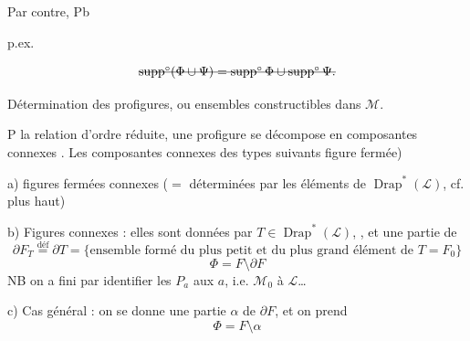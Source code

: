 \documentclass[11pt,a4paper]{article}
\begin{document}

Par contre,  Pb 


p.ex.



     
\[ \text{\struck{$\operatorname{supp}^\circ(\Phi\cup\Psi)=\operatorname{supp}^\circ\Phi\cup\operatorname{supp}^\circ\Psi$.}} \]

Détermination des profigures, ou ensembles constructibles dans $\mathcal{M}$.

 P\ill{} la relation d'ordre réduite, une profigure se décompose en composantes connexes . Les composantes connexes  des types suivants
   figure fermée)
 

a) figures fermées connexes  ($=$ déterminées par les éléments de $\operatorname{Drap}^*(\mathcal{L})$, cf. plus haut)

b) Figures  connexes :  elles sont données par $T\in\operatorname{Drap}^*(\mathcal{L})$, , et une partie de
\[ \partial F_T \overset{\text{déf}}{=} \partial T = \{\text{ensemble formé du plus petit et du plus grand élément de } T=F_0\} \]
\[ \Phi = F\setminus\partial F \]
NB on a fini par identifier les $P_a$ aux $a$, i.e. $\mathcal{M}_0$ à $\mathcal{L}$…

c) Cas général : on se donne une partie $\alpha$ de $\partial F$, et on prend
\[ \Phi = F\setminus\alpha \]
\end{document}
